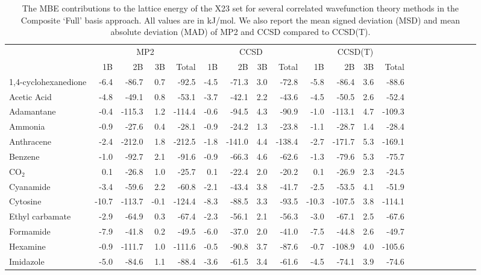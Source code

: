 \begin{table}[h]

\caption{\label{tab:x23_mbe_contributions}The MBE contributions to the lattice energy of the X23 set for several correlated wavefunction theory methods in the Composite `Full' basis approach. All values are in kJ/mol. We also report the mean signed deviation (MSD) and mean absolute deviation (MAD) of MP2 and CCSD compared to CCSD(T).}
\begin{tabular}{lrrrrrrrrrrrrrrrrrrrr}
\toprule
 & \multicolumn{4}{c}{MP2} & \multicolumn{4}{c}{CCSD} & \multicolumn{4}{c}{CCSD(T)} \\ \cmidrule(lr){2-5} \cmidrule(lr){6-9} \cmidrule(lr){10-13} 
 & 1B & 2B & 3B & Total & 1B & 2B & 3B & Total & 1B & 2B & 3B & Total \\
\midrule
1,4-cyclohexanedione & -6.4 & -86.7 & 0.7 & -92.5 & -4.5 & -71.3 & 3.0 & -72.8 & -5.8 & -86.4 & 3.6 & -88.6 \\
Acetic Acid & -4.8 & -49.1 & 0.8 & -53.1 & -3.7 & -42.1 & 2.2 & -43.6 & -4.5 & -50.5 & 2.6 & -52.4 \\
Adamantane & -0.4 & -115.3 & 1.2 & -114.4 & -0.6 & -94.5 & 4.3 & -90.9 & -1.0 & -113.1 & 4.7 & -109.3 \\
Ammonia & -0.9 & -27.6 & 0.4 & -28.1 & -0.9 & -24.2 & 1.3 & -23.8 & -1.1 & -28.7 & 1.4 & -28.4 \\
Anthracene & -2.4 & -212.0 & 1.8 & -212.5 & -1.8 & -141.0 & 4.4 & -138.4 & -2.7 & -171.7 & 5.3 & -169.1 \\
Benzene & -1.0 & -92.7 & 2.1 & -91.6 & -0.9 & -66.3 & 4.6 & -62.6 & -1.3 & -79.6 & 5.3 & -75.7 \\
CO$_2$ & 0.1 & -26.8 & 1.0 & -25.7 & 0.1 & -22.4 & 2.0 & -20.2 & 0.1 & -26.9 & 2.3 & -24.5 \\
Cyanamide & -3.4 & -59.6 & 2.2 & -60.8 & -2.1 & -43.4 & 3.8 & -41.7 & -2.5 & -53.5 & 4.1 & -51.9 \\
Cytosine & -10.7 & -113.7 & -0.1 & -124.4 & -8.3 & -88.5 & 3.3 & -93.5 & -10.3 & -107.5 & 3.8 & -114.1 \\
Ethyl carbamate & -2.9 & -64.9 & 0.3 & -67.4 & -2.3 & -56.1 & 2.1 & -56.3 & -3.0 & -67.1 & 2.5 & -67.6 \\
Formamide & -7.9 & -41.8 & 0.2 & -49.5 & -6.0 & -37.0 & 2.0 & -41.0 & -7.5 & -44.8 & 2.6 & -49.7 \\
Hexamine & -0.9 & -111.7 & 1.0 & -111.6 & -0.5 & -90.8 & 3.7 & -87.6 & -0.7 & -108.9 & 4.0 & -105.6 \\
Imidazole & -5.0 & -84.6 & 1.1 & -88.4 & -3.6 & -61.5 & 3.4 & -61.6 & -4.5 & -74.1 & 3.9 & -74.6 \\

\end{tabular}
\end{table}
